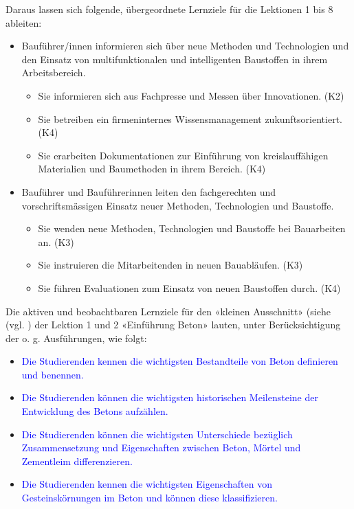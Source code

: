 \documentclass[
11pt,
captions=tableheading,
smallheadings,
headsepline,
footsepline, 
parskip=half-,
]{scrartcl}
\begin{document}
Daraus lassen sich folgende, übergeordnete Lernziele \cite{Lernfeldkatalog_Baufuehrer} für die Lektionen 1 bis 8 ableiten:
\begin{itemize}
    \item Bauführer/innen informieren sich über neue Methoden und Technologien und den Einsatz von multifunktionalen und intelligenten Baustoffen in ihrem Arbeitsbereich.
    \begin{itemize}
        \item Sie informieren sich aus Fachpresse und Messen über Innovationen. (K2)
        \item Sie betreiben ein firmeninternes Wissensmanagement zukunftsorientiert. (K4)
        \item Sie erarbeiten Dokumentationen zur Einführung von kreislauffähigen Materialien und Baumethoden in ihrem Bereich. (K4)
    \end{itemize}
    \item Bauführer und Bauführerinnen leiten den fachgerechten und vorschriftsmässigen Einsatz neuer Methoden, Technologien und Baustoffe.
    \begin{itemize}
        \item Sie wenden neue Methoden, Technologien und Baustoffe bei Bauarbeiten an. (K3)
        \item Sie instruieren die Mitarbeitenden in neuen Bauabläufen. (K3)
        \item Sie führen Evaluationen zum Einsatz von neuen Baustoffen durch. (K4)
    \end{itemize}
\end{itemize}

Die aktiven und beobachtbaren Lernziele für den «kleinen Ausschnitt» (siehe (vgl. \cite{Leitfaden_Aufgabenstellung_Lehrkonzept}) der Lektion 1 und 2 «Einführung Beton» lauten, unter Berücksichtigung der o. g. Ausführungen, wie folgt: 

\begin{itemize}
    \item \textcolor{blue}{Die Studierenden kennen die wichtigsten Bestandteile von Beton definieren und benennen.}
    \item \textcolor{blue}{Die Studierenden können die wichtigsten historischen Meilensteine der Entwicklung des Betons aufzählen.}
    \item \textcolor{blue}{Die Studierenden können die wichtigsten Unterschiede bezüglich Zusammensetzung und Eigenschaften zwischen Beton, Mörtel und Zementleim differenzieren.}
    \item \textcolor{blue}{Die Studierenden kennen die wichtigsten Eigenschaften von Gesteinskörnungen im Beton und können diese klassifizieren.}
\end{itemize}
\end{document}

